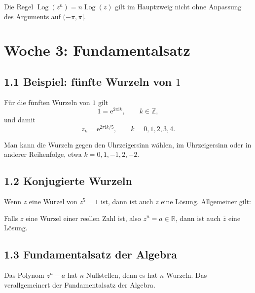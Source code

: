 \documentclass[11pt,a4paper]{article}
\newcommand{\R}{\mathbb R}
\newcommand{\Z}{\mathbb Z}
\newcommand{\ii}{\mathrm i}
\newcommand{\ee}{\mathrm e}
\newcommand{\Log}{\operatorname{Log}}
\begin{document}
\begin{importantbox}
Die Regel $\Log(z^n)=n\Log(z)$ gilt im Hauptzweig nicht ohne Anpassung des Arguments auf $(-\pi,\pi]$.
\end{importantbox}

\section{Woche 3: Fundamentalsatz}

\subsection{1.1 Beispiel: fünfte Wurzeln von $1$}
Für die fünften Wurzeln von $1$ gilt
\[
1=\ee^{2\pi\ii k},\qquad k\in\Z,
\]
und damit
\[
z_k=\ee^{2\pi\ii k/5},\qquad k=0,1,2,3,4.
\]

\begin{center}
\end{center}
Man kann die Wurzeln gegen den Uhrzeigersinn wählen, im Uhrzeigersinn oder in anderer Reihenfolge, etwa $k=0,1,-1,2,-2$.

\subsection{1.2 Konjugierte Wurzeln}
Wenn $z$ eine Wurzel von $z^5=1$ ist, dann ist auch $\overline z$ eine Lösung. Allgemeiner gilt:

\begin{importantbox}
Falls $z$ eine Wurzel einer reellen Zahl ist, also $z^n=a\in\R$, dann ist auch $\overline z$ eine Lösung.
\end{importantbox}

\subsection{1.3 Fundamentalsatz der Algebra}
Das Polynom $z^n-a$ hat $n$ Nullstellen, denn es hat $n$ Wurzeln. Das verallgemeinert der Fundamentalsatz der Algebra.
\end{document}
